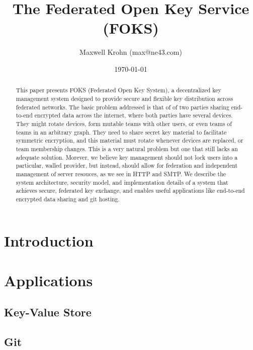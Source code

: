 \documentclass[11pt]{article}
\title{The Federated Open Key Service (FOKS)}
\author{Maxwell Krohn (max@ne43.com)}
\date{\today}
\begin{document}
\newcommand{\yubi}{Yubikey}
\newcommand{\Yubi}{Yubikey}
\newcommand{\yubis}{Yubikeys}
\newcommand{\Yubis}{Yubikeys}

\maketitle

\begin{abstract}

This paper presents FOKS (Federated Open Key System), a
decentralized key management system designed to provide secure and flexible key
distribution across federated networks. The basic problem addressed is that of
of two parties sharing end-to-end encrypted data across the internet, where both
parties have several devices. They might rotate devices, form mutable teams with
other users, or even teams of teams in an arbitrary graph. They need to share
secret key material to facilitate symmetric encryption, and this material must
rotate whenever devices are replaced, or team membership changes.  This is a
very natural problem but one that still lacks an adequate solution.  Morever, we
believe key management should not lock users into a particular, walled provider,
but instead, should allow for federation and independent management of server
resouces, as we see in HTTP and SMTP.  We describe the system architecture,
security model, and implementation details of a system that achieves secure,
federated key exchange, and enables useful applications like end-to-end
encrypted data sharing and git hosting.

\end{abstract}


\section{Introduction}





\section{Applications}

\subsection{Key-Value Store}

\subsection{Git}
\end{document}
